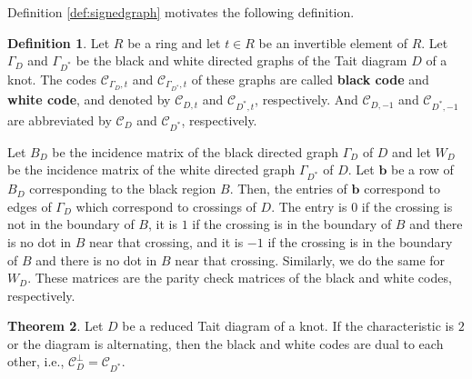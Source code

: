 \documentclass[11pt,a4paper]{article}
\theoremstyle{definition}
\newtheorem{theorem}{Theorem}[section]
\newtheorem{definition}[theorem]{Definition}
\newcommand{\mC}{\mathcal{C}}
\begin{document}
Definition \ref{def:signedgraph} motivates the following definition.

\begin{definition}
\label{def:blackcode}
Let $R$ be a ring and let $t\in R$ be an invertible element of $R$.
Let $\Gamma _D$ and $\Gamma_{D^*}$ be the black and white directed graphs of the Tait diagram $D$ of a knot. 
The codes $\mC_{\Gamma_D,t}$ and $\mC_{\Gamma_{D^*},t}$ of these graphs are called \textbf{black code} and \textbf{white code}, 
and denoted by $\mC_{D,t}$ and $\mC_{D^*,t}$, respectively.
And $\mC_{D,-1}$ and $\mC_{D^*,-1}$ are abbreviated by $\mC_{D}$ and $\mC_{D^*}$, respectively.
\end{definition}

Let $B_D$ be the incidence matrix of the black directed graph $\Gamma_D$ of $D$ and let  $W_D$ be the incidence matrix of the white directed graph $\Gamma_{D^*}$ of $D$.
Let $\mathbf{b}$ be a row of $B_D$ corresponding to the black region $B$. Then, the entries of $\mathbf{b}$ correspond to edges of $\Gamma _D$ which correspond to crossings of $D$. The entry is $0$ if the crossing is not in the boundary of $B$, it is $1$ if the crossing is in the boundary of $B$ and there is no dot in $B$ near that crossing, and it is $-1$ if the crossing is in the boundary of $B$ and there is no dot in $B$ near that crossing. Similarly, we do the same for $W_D$. These matrices are the parity check matrices of the black and white codes, respectively.


 \begin{theorem}
 \label{p-dual-black-white}
 Let $D$ be a reduced Tait diagram of a knot.
 If the characteristic is $2$ or the diagram is alternating, 
 then the black and white codes are dual to each other, i.e., $\mC_D^\perp =\mC_{D^*}$.
 \end{theorem}
 
\end{document}
